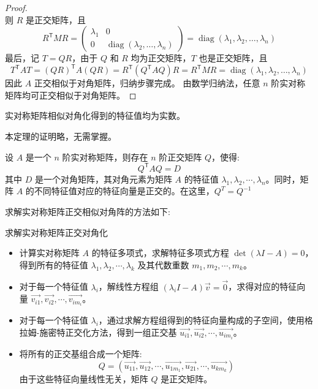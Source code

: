 \documentclass[a4paper,12pt]{ctexart}
\begin{document}
\begin{proof}
\[    \]
    则 $R$ 是正交矩阵，且
    \[
    R^{\mathsf{T}} M R = \begin{pmatrix} \lambda_1 & 0 \\ 0 & \operatorname{diag}(\lambda_2, \ldots, \lambda_n) \end{pmatrix} = \operatorname{diag}(\lambda_1, \lambda_2, \ldots, \lambda_n)
    \]
    最后，记 $T = Q R$，由于 $Q$ 和 $R$ 均为正交矩阵，$T$ 也是正交矩阵，且
    \[
    T^{\mathsf{T}} A T = (QR)^{\mathsf{T}} A (QR) = R^{\mathsf{T}} (Q^{\mathsf{T}} A Q) R = R^{\mathsf{T}} M R = \operatorname{diag}(\lambda_1, \lambda_2, \ldots, \lambda_n)
    \]
    因此 $A$ 正交相似于对角矩阵，归纳步骤完成。
    由数学归纳法，任意 $n$ 阶实对称矩阵均可正交相似于对角矩阵。
\end{proof}

\begin{mythm}{}{}
    实对称矩阵相似对角化得到的特征值均为实数。
\end{mythm}
本定理的证明略，无需掌握。

\begin{mythm}{}{}
    设 $A$ 是一个 $n$ 阶实对称矩阵，则存在 $n$ 阶正交矩阵 $Q$，使得:
    \[
    Q^{\mathsf{T}} A Q = D
    \]
    其中 $D$ 是一个对角矩阵，其对角元素为矩阵 $A$ 的特征值 $\lambda_1, \lambda_2, \cdots, \lambda_n$。同时，矩阵 $A$ 的不同特征值对应的特征向量是正交的。在这里，$Q^T= Q^{-1}$
\end{mythm}

求解实对称矩阵正交相似对角阵的方法如下:

\begin{myalgo}{求解实对称矩阵正交对角化}{}
\begin{itemize}
    \item 计算实对称矩阵 $A$ 的特征多项式，求解特征多项式方程 $\det(\lambda I - A) = 0$，得到所有的特征值 $\lambda_1, \lambda_2, \cdots, \lambda_k$ 及其代数重数 $m_1, m_2, \cdots, m_k$。
    \item 对于每一个特征值 $\lambda_i$，解线性方程组 $(\lambda_i I - A) \vec{v} = \vec{0}$，求得对应的特征向量 $\vec{v_{i1}}, \vec{v_{i2}}, \cdots, \vec{v_{im_i}}$。
    \item 对于每一个特征值 $\lambda_i$，通过求解方程组得到的特征向量构成的子空间，使用格拉姆-施密特正交化方法，得到一组正交基 $\vec{u_{i1}}, \vec{u_{i2}}, \cdots, \vec{u_{im_i}}$。
    \item 将所有的正交基组合成一个矩阵:
    \[
    Q = (\vec{u_{11}}, \vec{u_{12}}, \cdots, \vec{u_{1m_1}}, \vec{u_{21}}, \cdots, \vec{u_{km_k}})
    \]
    由于这些特征向量线性无关，矩阵 $Q$ 是正交矩阵。
\end{itemize}
\end{myalgo}
\end{document}
